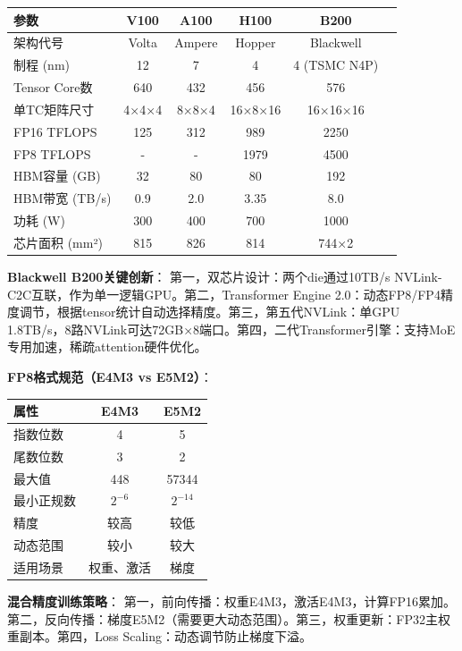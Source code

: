 \begin{table}[H]
\centering
\small
\begin{tabular}{lccccc}
\toprule
\textbf{参数} & \textbf{V100} & \textbf{A100} & \textbf{H100} & \textbf{B200} \\
\midrule
架构代号 & Volta & Ampere & Hopper & Blackwell \\
制程 (nm) & 12 & 7 & 4 & 4 (TSMC N4P) \\
Tensor Core数 & 640 & 432 & 456 & 576 \\
单TC矩阵尺寸 & 4×4×4 & 8×8×4 & 16×8×16 & 16×16×16 \\
FP16 TFLOPS & 125 & 312 & 989 & 2250 \\
FP8 TFLOPS & - & - & 1979 & 4500 \\
HBM容量 (GB) & 32 & 80 & 80 & 192 \\
HBM带宽 (TB/s) & 0.9 & 2.0 & 3.35 & 8.0 \\
功耗 (W) & 300 & 400 & 700 & 1000 \\
芯片面积 (mm²) & 815 & 826 & 814 & 744×2 \\
\bottomrule
\end{tabular}
\end{table}

\textbf{Blackwell B200关键创新}：
第一，双芯片设计：两个die通过10TB/s NVLink-C2C互联，作为单一逻辑GPU。第二，Transformer Engine 2.0：动态FP8/FP4精度调节，根据tensor统计自动选择精度。第三，第五代NVLink：单GPU 1.8TB/s，8路NVLink可达72GB×8端口。第四，二代Transformer引擎：支持MoE专用加速，稀疏attention硬件优化。

\textbf{FP8格式规范（E4M3 vs E5M2）}：

\begin{table}[H]
\centering
\small
\begin{tabular}{lcc}
\toprule
\textbf{属性} & \textbf{E4M3} & \textbf{E5M2} \\
\midrule
指数位数 & 4 & 5 \\
尾数位数 & 3 & 2 \\
最大值 & 448 & 57344 \\
最小正规数 & $2^{-6}$ & $2^{-14}$ \\
精度 & 较高 & 较低 \\
动态范围 & 较小 & 较大 \\
适用场景 & 权重、激活 & 梯度 \\
\bottomrule
\end{tabular}
\end{table}

\textbf{混合精度训练策略}：
第一，前向传播：权重E4M3，激活E4M3，计算FP16累加。第二，反向传播：梯度E5M2（需要更大动态范围）。第三，权重更新：FP32主权重副本。第四，Loss Scaling：动态调节防止梯度下溢。

